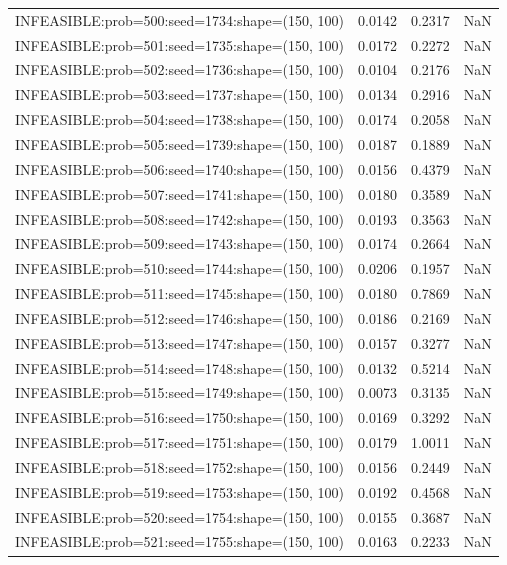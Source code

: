 \begin{longtable}{lccc}
INFEASIBLE:prob=500:seed=1734:shape=(150, 100) &   0.0142 &  0.2317 &    NaN \\
INFEASIBLE:prob=501:seed=1735:shape=(150, 100) &   0.0172 &  0.2272 &    NaN \\
INFEASIBLE:prob=502:seed=1736:shape=(150, 100) &   0.0104 &  0.2176 &    NaN \\
INFEASIBLE:prob=503:seed=1737:shape=(150, 100) &   0.0134 &  0.2916 &    NaN \\
INFEASIBLE:prob=504:seed=1738:shape=(150, 100) &   0.0174 &  0.2058 &    NaN \\
INFEASIBLE:prob=505:seed=1739:shape=(150, 100) &   0.0187 &  0.1889 &    NaN \\
INFEASIBLE:prob=506:seed=1740:shape=(150, 100) &   0.0156 &  0.4379 &    NaN \\
INFEASIBLE:prob=507:seed=1741:shape=(150, 100) &   0.0180 &  0.3589 &    NaN \\
INFEASIBLE:prob=508:seed=1742:shape=(150, 100) &   0.0193 &  0.3563 &    NaN \\
INFEASIBLE:prob=509:seed=1743:shape=(150, 100) &   0.0174 &  0.2664 &    NaN \\
INFEASIBLE:prob=510:seed=1744:shape=(150, 100) &   0.0206 &  0.1957 &    NaN \\
INFEASIBLE:prob=511:seed=1745:shape=(150, 100) &   0.0180 &  0.7869 &    NaN \\
INFEASIBLE:prob=512:seed=1746:shape=(150, 100) &   0.0186 &  0.2169 &    NaN \\
INFEASIBLE:prob=513:seed=1747:shape=(150, 100) &   0.0157 &  0.3277 &    NaN \\
INFEASIBLE:prob=514:seed=1748:shape=(150, 100) &   0.0132 &  0.5214 &    NaN \\
INFEASIBLE:prob=515:seed=1749:shape=(150, 100) &   0.0073 &  0.3135 &    NaN \\
INFEASIBLE:prob=516:seed=1750:shape=(150, 100) &   0.0169 &  0.3292 &    NaN \\
INFEASIBLE:prob=517:seed=1751:shape=(150, 100) &   0.0179 &  1.0011 &    NaN \\
INFEASIBLE:prob=518:seed=1752:shape=(150, 100) &   0.0156 &  0.2449 &    NaN \\
INFEASIBLE:prob=519:seed=1753:shape=(150, 100) &   0.0192 &  0.4568 &    NaN \\
INFEASIBLE:prob=520:seed=1754:shape=(150, 100) &   0.0155 &  0.3687 &    NaN \\
INFEASIBLE:prob=521:seed=1755:shape=(150, 100) &   0.0163 &  0.2233 &    NaN \\

\end{longtable}
